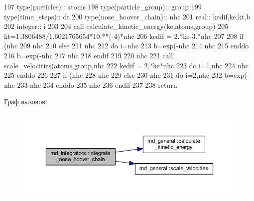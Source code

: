 \begin{DoxyCode}
197     \textcolor{keywordtype}{type}(particles)::   atoms
198     \textcolor{keywordtype}{type}(particle\_group):: group
199     \textcolor{keywordtype}{type}(time\_steps):: dt
200     \textcolor{keywordtype}{type}(nose\_hoover\_chain):: nhc
201     \textcolor{keywordtype}{real}:: kedif,ke,kt,b
202     \textcolor{keywordtype}{integer}::       i
203 
204     \textcolor{keyword}{call }calculate\_kinetic\_energy(ke,atoms,group)
205     kt=1.3806488/1.6021765654*10.**(-4)*nhc%
206     kedif = 2.*ke-3.*nhc%
207 
208     \textcolor{keywordflow}{if} (nhc%
209         nhc%
210     \textcolor{keywordflow}{else}
211         nhc%
212         \textcolor{keywordflow}{do} i=nhc%
213             b=exp(-nhc%
214             nhc%
215 \textcolor{keywordflow}{        enddo}
216         b=exp(-nhc%
217         nhc%
218 \textcolor{keywordflow}{    endif}
219 
220     nhc%
221     \textcolor{keyword}{call }scale\_velocities(atoms,group,nhc%
222     kedif = 2.*ke*nhc%
223     \textcolor{keywordflow}{do} i=1,nhc%
224         nhc%
225 \textcolor{keywordflow}{    enddo}
226 
227     \textcolor{keywordflow}{if} (nhc%
228         nhc%
229     \textcolor{keywordflow}{else}
230         nhc%
231         \textcolor{keywordflow}{do} i=2,nhc%
232             b=exp(-nhc%
233             nhc%
234 \textcolor{keywordflow}{        enddo}
235         nhc%
236 \textcolor{keywordflow}{    endif}
237 
238     \textcolor{keywordflow}{return}
\end{DoxyCode}
Граф вызовов\+:\nopagebreak
\begin{figure}[H]
\begin{center}
\leavevmode
\includegraphics[width=350pt]{namespacemd__integrators_a769781abbe7ac3aaacf761d6321d4722_cgraph}
\end{center}
\end{figure}
